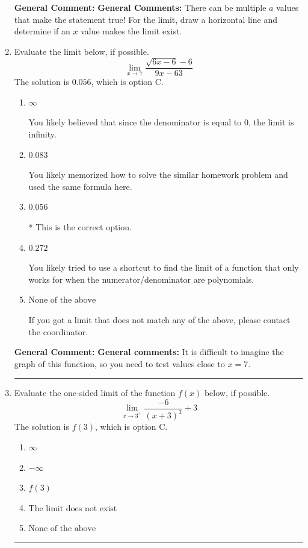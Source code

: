 \documentclass{extbook}[14pt]
\newcommand{\litem}[1]{\item #1

\rule{\textwidth}{0.4pt}}
\begin{document}
\begin{enumerate}
{\begin{enumerate}[label=\Alph*.]
\end{enumerate}

\textbf{General Comment:} \textbf{General Comments:} There can be multiple $a$ values that make the statement true! For the limit, draw a horizontal line and determine if an $x$ value makes the limit exist.
}
\litem{
Evaluate the limit below, if possible.
\[ \lim_{x \rightarrow 7} \frac{\sqrt{6x - 6} - 6}{9x - 63} \]The solution is \( 0.056 \), which is option C.\begin{enumerate}[label=\Alph*.]
\item \( \infty \)

You likely believed that since the denominator is equal to 0, the limit is infinity.
\item \( 0.083 \)

You likely memorized how to solve the similar homework problem and used the same formula here.
\item \( 0.056 \)

* This is the correct option.
\item \( 0.272 \)

You likely tried to use a shortcut to find the limit of a function that only works for when the numerator/denominator are polynomials.
\item \( \text{None of the above} \)

If you got a limit that does not match any of the above, please contact the coordinator.
\end{enumerate}

\textbf{General Comment:} \textbf{General comments:} It is difficult to imagine the graph of this function, so you need to test values close to $x = 7$.
}
\litem{
Evaluate the one-sided limit of the function $f(x)$ below, if possible.
\[ \lim_{x \rightarrow 3^+} \frac{-6}{(x+3)^3}+3 \]The solution is \( f(3) \), which is option C.\begin{enumerate}[label=\Alph*.]
\item \( \infty \)


\item \( -\infty \)


\item \( f(3) \)


\item \( \text{The limit does not exist} \)


\item \( \text{None of the above} \)


\end{enumerate}

}
\end{enumerate}
\end{document}
